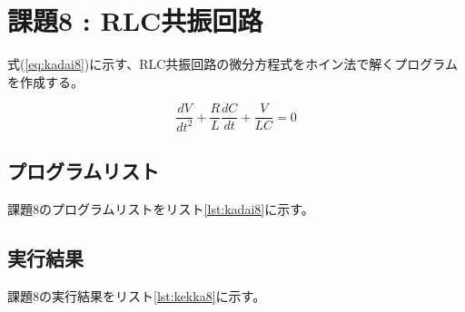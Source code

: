 \documentclass[a4j,titlepage]{jsarticle}
\begin{document}
\section{課題8 : RLC共振回路}
式(\ref{eq:kadai8})に示す、RLC共振回路の微分方程式をホイン法で解くプログラムを作成する。

\begin{equation}
  \frac{dV}{dt^2}+\frac{R}{L}\frac{dC}{dt}+\frac{V}{LC}=0
  \label{eq:kadai8}
\end{equation}

\subsection{プログラムリスト}
課題8のプログラムリストをリスト\ref{lst:kadai8}に示す。



\subsection{実行結果}
課題8の実行結果をリスト\ref{lst:kekka8}に示す。
\end{document}
